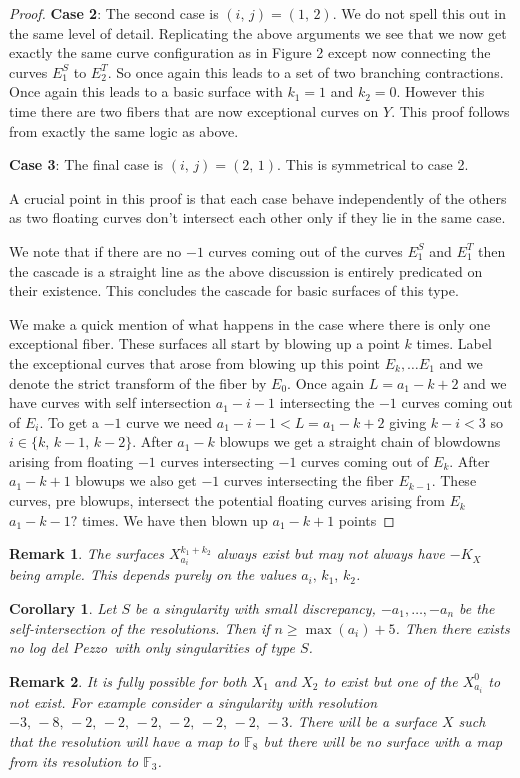 \documentclass[12pt,a4paper]{book}      %
\newtheorem{cor}[thm]{Corollary}
\newtheorem*{rem}{Remark}
\newcommand{\ldp}{log del Pezzo}
\newcommand{\mb}[1]{\mathbb{#1}}
\begin{document}
\begin{proof}
\textbf{Case 2}: The second case is $(i, \, j) = (1, \, 2)$. We do not spell this out in the same level of detail. Replicating the above arguments we see that we now get exactly the same curve configuration as in Figure 2 except now connecting the curves $E_1^S$ to $E_2^T$. So once again this leads to a set of two branching contractions. Once again this leads to a basic surface with $k_1 = 1$ and $k_2 = 0$. However this time there are two fibers that are now exceptional curves on $Y$. This proof follows from exactly the same logic as above.

\textbf{Case 3}: The final case is $(i, \, j) = (2, \, 1)$. This is symmetrical to case 2.

A crucial point in this proof is that each case behave independently of the others as two floating curves don't intersect each other only if they lie in the same case.

We note that if there are no $-1$ curves coming out of the curves $E_1^S$ and $E_1^T$ then the cascade is a straight line as the above discussion is entirely predicated on their existence. This concludes the cascade for basic surfaces of this type. 

We make a quick mention of what happens in the case where there is only one exceptional fiber. These surfaces all start by blowing up a point $k$ times. Label the exceptional curves that arose from blowing up this point $E_{k}, \dots E_1$ and we denote the strict transform of the fiber by $E_{0}$. Once again $L = a_1 -k+ 2$ and we have curves with self intersection $a_1 - i -1$ intersecting the $-1$ curves coming out of $E_i$. To get a $-1$ curve we need $a_1 - i - 1 < L = a_1 - k+2$ giving $k-i < 3$ so $i \in \{ k, \, k-1,\, k-2 \}$.  After $a_1-k$ blowups we get a straight chain of blowdowns arising from floating $-1$ curves intersecting $-1$ curves coming out of $E_k$. After $a_1-k+1$ blowups we also get $-1$ curves intersecting the fiber $E_{k-1}$. These curves, pre blowups, intersect the potential floating curves arising from $E_k$ $a_1 - k - 1?$ times. We have then blown up $a_1-k+1$ points 


\end{proof}

\begin{rem}
The surfaces $X_{a_i}^{k_1 + k_2}$ always exist but may not always have $-K_X$ being ample. This depends purely on the values $a_i, \, k_1, \, k_2$.
\end{rem}
\begin{cor}
Let $S$ be a singularity with small discrepancy, $-a_1, \dots , -a_n$ be the self-intersection of the resolutions. Then if $n \geq \max (a_i) + 5 $. Then there exists no \ldp\ with only singularities of type $S$.
\end{cor}
\begin{rem}
It is fully possible for both $X_1$ and $X_2$ to exist but one of the $X_{a_i}^0$ to not exist. For example consider a singularity with resolution $-3, \, -8, \, -2, \, -2, \, -2, \, -2, \, -2, \, -2, \, -3$. There will be a surface $X$ such that the resolution will have a map to $\mb{F}_8$ but there will be no surface with a map from its resolution to $\mb{F}_3$.
\end{rem}
\end{document}
